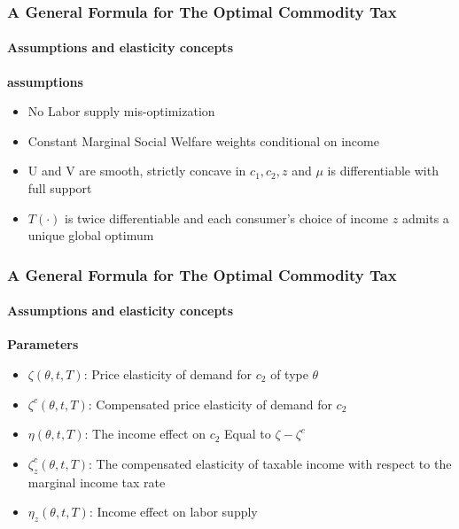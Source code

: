 \documentclass{beamer}
\begin{document}
\begin{frame}
\frametitle{A General Formula for The Optimal Commodity Tax}
\framesubtitle{Assumptions and elasticity concepts}

\textbf{assumptions}
\begin{itemize}
	\item No Labor supply mis-optimization
	\item Constant Marginal Social Welfare weights conditional on income 
	\item U and V are smooth, strictly concave in $c_1, c_2, z$ and $\mu$ is differentiable with full support 
	\item $T(\cdot)$ is twice differentiable and each consumer's choice of income $z$ admits a unique global optimum
	
\end{itemize}

\end{frame}




\begin{frame}
\frametitle{A General Formula for The Optimal Commodity Tax}
\framesubtitle{Assumptions and elasticity concepts}

\textbf{Parameters}
\begin{itemize}
	\item $\zeta(\theta,t,T)$: Price elasticity of demand for $c_2$ of type $\theta$
	\item  $\zeta^c(\theta,t,T)$: Compensated price elasticity of demand for $c_2$
	\item $\eta(\theta, t,T)$: The income effect on $c_2$ Equal to $\zeta -\zeta^c $
	\item  $\zeta^c_z(\theta,t,T)$: The compensated elasticity of taxable income with respect to the marginal income tax rate 
	\item $\eta_z(\theta, t,T)$: Income effect on labor supply
	
\end{itemize}

\end{frame}
\end{document}
